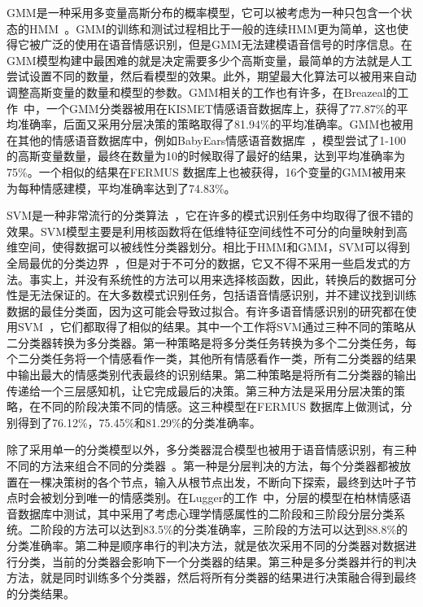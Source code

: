 GMM是一种采用多变量高斯分布的概率模型，它可以被考虑为一种只包含一个状态的HMM~\cite{Vlassis2002A, Reynolds1995Robust}。GMM的训练和测试过程相比于一般的连续HMM更为简单，这也使得它被广泛的使用在语音情感识别，但是GMM无法建模语音信号的时序信息。在GMM模型构建中最困难的就是决定需要多少个高斯变量，最简单的方法就是人工尝试设置不同的数量，然后看模型的效果。此外，期望最大化算法可以被用来自动调整高斯变量的数量和模型的参数。GMM相关的工作也有许多，在Breazeal的工作~\cite{Breazeal2002Recognition}中，一个GMM分类器被用在KISMET情感语音数据库上，获得了77.87\%的平均准确率，后面又采用分层决策的策略取得了81.94\%的平均准确率。GMM也被用在其他的情感语音数据库中，例如BabyEars情感语音数据库~\cite{Slaney2003Baby}，模型尝试了1-100的高斯变量数量，最终在数量为10的时候取得了最好的结果，达到平均准确率为75\%。一个相似的结果在FERMUS \uppercase\expandafter{}数据库上也被获得，16个变量的GMM被用来为每种情感建模，平均准确率达到了74.83\%。

SVM是一种非常流行的分类算法~\cite{Burges2008A}，它在许多的模式识别任务中均取得了很不错的效果。SVM模型主要是利用核函数将在低维特征空间线性不可分的向量映射到高维空间，使得数据可以被线性分类器划分。相比于HMM和GMM，SVM可以得到全局最优的分类边界~\cite{Burges1998A}，但是对于不可分的数据，它又不得不采用一些启发式的方法。事实上，并没有系统性的方法可以用来选择核函数，因此，转换后的数据可分性是无法保证的。在大多数模式识别任务，包括语音情感识别，并不建议找到训练数据的最佳分类面，因为这可能会导致过拟合。有许多语音情感识别的研究都在使用SVM~\cite{Lee2004Emotion, Schuller2004Speech, Kwon2003Emotion, Pierre2003The}，它们都取得了相似的结果。其中一个工作将SVM通过三种不同的策略从二分类器转换为多分类器。第一种策略是将多分类任务转换为多个二分类任务，每个二分类任务将一个情感看作一类，其他所有情感看作一类，所有二分类器的结果中输出最大的情感类别代表最终的识别结果。第二种策略是将所有二分类器的输出传递给一个三层感知机，让它完成最后的决策。第三种方法是采用分层决策的策略，在不同的阶段决策不同的情感。这三种模型在FERMUS \uppercase\expandafter{}数据库上做测试，分别得到了76.12\%，75.45\%和81.29\%的分类准确率。

除了采用单一的分类模型以外，多分类器混合模型也被用于语音情感识别，有三种不同的方法来组合不同的分类器~\cite{Kuncheva2004Combining, Lugger2015Combining}。第一种是分层判决的方法，每个分类器都被放置在一棵决策树的各个节点，输入从根节点出发，不断向下探索，最终到达叶子节点时会被划分到唯一的情感类别。在Lugger的工作~\cite{Lugger2008Psychological}中，分层的模型在柏林情感语音数据库中测试，其中采用了考虑心理学情感属性的二阶段和三阶段分层分类系统。二阶段的方法可以达到83.5\%的分类准确率，三阶段的方法可以达到88.8\%的分类准确率。第二种是顺序串行的判决方法，就是依次采用不同的分类器对数据进行分类，当前的分类器会影响下一个分类器的结果。第三种是多分类器并行的判决方法，就是同时训练多个分类器，然后将所有分类器的结果进行决策融合得到最终的分类结果。

